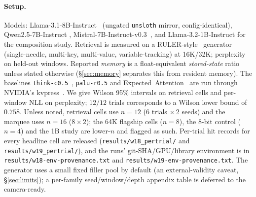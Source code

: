 \documentclass[11pt]{article}
\begin{document}
\paragraph{Setup.} Models: Llama-3.1-8B-Instruct~\citep{grattafiori2024llama3}
(ungated \texttt{unsloth} mirror, config-identical), Qwen2.5-7B-Instruct
\citep{qwen2025qwen25}, Mistral-7B-Instruct-v0.3~\citep{jiang2023mistral7b}, and
Llama-3.2-1B-Instruct for the composition study. Retrieval is measured on a
RULER-style~\citep{hsieh2024ruler} generator (single-needle, multi-key,
multi-value, variable-tracking) at 16K/32K; perplexity on held-out windows.
Reported \emph{memory} is a float-equivalent \emph{stored-state} ratio unless
stated otherwise (\S\ref{sec:memory} separates this from resident memory). The
baselines \texttt{think-c0.5}~\citep{xu2024think}, \texttt{palu-r0.5}
\citep{chang2025palu} and Expected~Attention~\citep{devoto2025expected} are run
through NVIDIA's kvpress~\citep{nvidia2024kvpress}. We
give Wilson 95\% intervals on retrieval cells and per-window NLL on perplexity;
$12/12$ trials corresponds to a Wilson lower bound of $0.758$. Unless noted,
retrieval cells use $n{=}12$ ($6$ trials $\times\,2$ seeds) and the marquee uses
$n{=}16$ ($8\times2$); the 64K flagship cells ($n{=}8$), the 8-bit control ($n{=}4$) and
the 1B study are lower-$n$ and flagged as such. Per-trial hit records for every headline cell are released
(\texttt{results/w18\_pertrial/} and \texttt{results/w19\_pertrial/}), and the
runs' git-SHA/GPU/library environment is in
\texttt{results/w18-env-provenance.txt} and
\texttt{results/w19-env-provenance.txt}. The generator uses a small fixed
filler pool by default (an external-validity caveat, \S\ref{sec:limits}); a
per-family seed/window/depth appendix table is deferred to the camera-ready.
\end{document}
